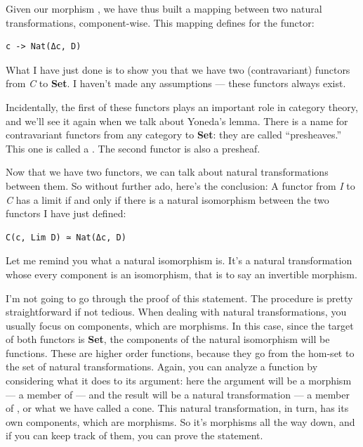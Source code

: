 Given our morphism , we have thus built a mapping between two
natural transformations, component-wise. This mapping defines
 for the functor:

\begin{verbatim}
c -> Nat(Δc, D)
\end{verbatim}

What I have just done is to show you that we have two (contravariant)
functors from \emph{C} to \textbf{Set}. I haven't made any assumptions
--- these functors always exist.

Incidentally, the first of these functors plays an important role in
category theory, and we'll see it again when we talk about Yoneda's
lemma. There is a name for contravariant functors from any category
 to \textbf{Set}: they are called ``presheaves.'' This one is
called a . The second functor is also a
presheaf.

Now that we have two functors, we can talk about natural transformations
between them. So without further ado, here's the conclusion: A functor
 from \emph{I} to \emph{C} has a limit  if and
only if there is a natural isomorphism between the two functors I have
just defined:

\begin{verbatim}
C(c, Lim D) ≃ Nat(Δc, D)
\end{verbatim}

Let me remind you what a natural isomorphism is. It's a natural
transformation whose every component is an isomorphism, that is to say
an invertible morphism.

I'm not going to go through the proof of this statement. The procedure
is pretty straightforward if not tedious. When dealing with natural
transformations, you usually focus on components, which are morphisms.
In this case, since the target of both functors is \textbf{Set}, the
components of the natural isomorphism will be functions. These are
higher order functions, because they go from the hom-set to the set of
natural transformations. Again, you can analyze a function by
considering what it does to its argument: here the argument will be a
morphism --- a member of  --- and the result will
be a natural transformation --- a member of , or
what we have called a cone. This natural transformation, in turn, has
its own components, which are morphisms. So it's morphisms all the way
down, and if you can keep track of them, you can prove the statement.

